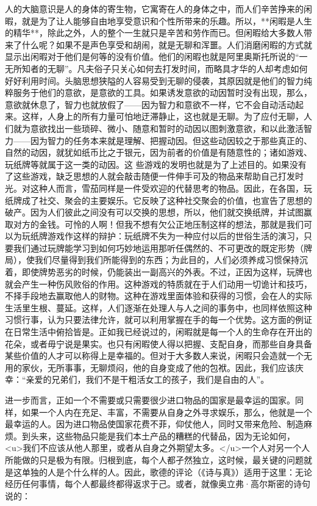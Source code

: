 \documentclass[12pt,oneside]{book}
\begin{document}
人的大脑意识是人的身体的寄生物，它寓寄在人的身体之中，而人们辛苦挣来的闲暇，就是为了让人能够自由地享受意识和个性所带来的乐趣。所以，**闲暇是人生的精华**，除此之外，人的整个一生就只是辛苦和劳作而已。但闲暇给大多数人带来了什么呢？如果不是声色享受和胡闹，就是无聊和浑噩。人们消磨闲暇的方式就显示出闲暇对于他们是何等的没有价值。他们的闲暇也就是阿里奥斯托所说的“一无所知者的无聊”。凡夫俗子只关心如何去打发时间，而略具才华的人却考虑如何好好利用时间。头脑思想狭隘的人容易受到无聊的侵袭，其原因就是他们的智力纯粹服务于他们的意欲，是意欲的工具。如果诱发意欲的动因暂时没有出现，那么，意欲就休息了，智力也就放假了——因为智力和意欲不一样，它不会自动活动起来。这样，人身上的所有力量可怕地迂滞静止，这也就是无聊。为了应付无聊，人们就为意欲找出一些琐碎、微小、随意和暂时的动因以图刺激意欲，和以此激活智力——因为智力的任务本来就是理解、把握动因。但这些动因较之于那些真正的、自然的动因，就犹如纸币比之于银元，因为前者的价值是有随意性的；诸如游戏、玩纸牌等就属于这一类的动因。这
些游戏的发明也就是为了上述目的。如果没有了这些游戏，缺乏思想的人就会敲击随便一件伸手可及的物品来帮助自己打发时光。对这种人而言，雪茄同样是一件受欢迎的代替思考的物品。因此，在各国，玩纸牌成了社交、聚会的主要娱乐。它反映了这种社交聚会的价值，也宣告了思想的破产。因为人们彼此之间没有可以交换的思想，所以，他们就交换纸牌，并试图赢取对方的金钱。可怜的人啊！但我不想有欠公正地压制这样的想法，那就是我们可以为玩纸牌游戏作这样的辩护：玩纸牌不失为一种应付以后的世俗生活的演习，只要我们通过玩牌能学习到如何巧妙地运用那听任偶然的、不可更改的既定形势（牌局），使我们尽量得到我们所能得到的东西；为此目的，人们必须养成习惯保持沉着，即使牌势恶劣的时候，仍能装出一副高兴的外表。不过，正因为这样，玩牌也就会产生一种伤风败俗的作用。这种游戏的特质就在于人们动用一切诡计和技巧，不择手段地去赢取他人的财物。这种在游戏里面体验和获得的习惯，会在人的实际生活里生根、蔓延。这样，人们逐渐在处理人与人之间的事务中，也同样依照这种习惯行事，认为只要法律允许，就可以利用掌握在手的每一个优势。这方面的例证在日常生活中俯拾皆是。正如我已经说过的，闲暇就是每一个人的生命存在开出的花朵，或者毋宁说是果实。也只有闲暇使人得以把握、支配自身，而那些自身具备某些价值的人才可以称得上是幸福的。但对于大多数人来说，闲暇只会造就一个无用的家伙，无所事事，无聊烦闷，他的自身变成了他的包袱。因此，我们应该庆幸：“亲爱的兄弟们，我们不是干粗活女工的孩子，我们是自由的人”。 

进一步而言，正如一个不需要或只需要很少进口物品的国家是最幸运的国家。同样，如果一个人内在充足、丰富，不需要从自身之外寻求娱乐，那么，他就是一个最幸运的人。因为进口物品使国家花费不菲，仰仗他人，同时又带来危险、制造麻烦。到头来，这些物品只能是我们本土产品的糟糕的代替品，因为无论如何，<u>我们不应该从他人那里，或者从自身之外期望太多。</u>一个人对另一个人所能做的只是极为有限。归根到底，每个人都孑然独立，这时候，最关键的问题就是这单独的人是个什么样的人。因此，歌德的评论（《诗与真》）适用于这里：无论经历任何事情，每个人都最终都得返求于己。或者，就像奥立弗·高尔斯密的诗句说的： 
\end{document}
